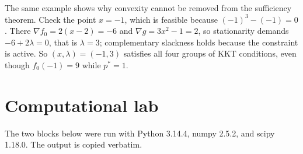 The same example shows why convexity cannot be removed from the sufficiency theorem. Check the
point $x=-1$, which is feasible because $(-1)^{3}-(-1)=0$. There
$\nabla f_{0}=2(x-2)=-6$ and $\nabla g=3x^{2}-1=2$, so stationarity demands $-6+2\lambda=0$, that
is $\lambda=3$; complementary slackness holds because the constraint is active. So
$(x,\lambda)=(-1,3)$ satisfies all four groups of KKT conditions, even though
$f_{0}(-1)=9$ while $p^{*}=1$.


\section{Computational lab}

The two blocks below were run with Python 3.14.4, numpy 2.5.2, and scipy 1.18.0. The output is
copied verbatim.

